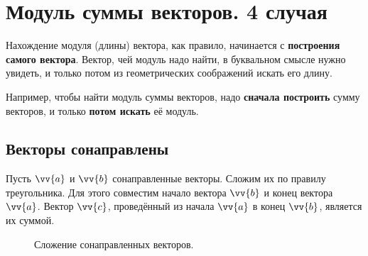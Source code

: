 \section{Модуль суммы векторов. 4 случая}
Нахождение модуля (длины) вектора, как правило, начинается с \textbf{построения самого вектора}.
Вектор, чей модуль надо найти, в буквальном смысле нужно увидеть, и
только потом из геометрических соображений искать его длину.

Например, чтобы найти модуль суммы векторов,
надо \textbf{сначала построить} сумму векторов, и только
\textbf{потом искать} её модуль.
\subsection{Векторы сонаправлены}
Пусть $\vv{a}$ и $\vv{b}$ \bdash сонаправленные векторы. Сложим их по правилу треугольника.
Для этого совместим начало вектора $\vv{b}$ и конец вектора $\vv{a}$. Вектор $\vv{c}$,
проведённый из начала $\vv{a}$ в конец $\vv{b}$, является их суммой.

\begin{figure}[h!]
  \centering
  \hspace{1.4cm}
  \caption{\small Сложение сонаправленных векторов.}\label{pic:sum1}
\end{figure}

